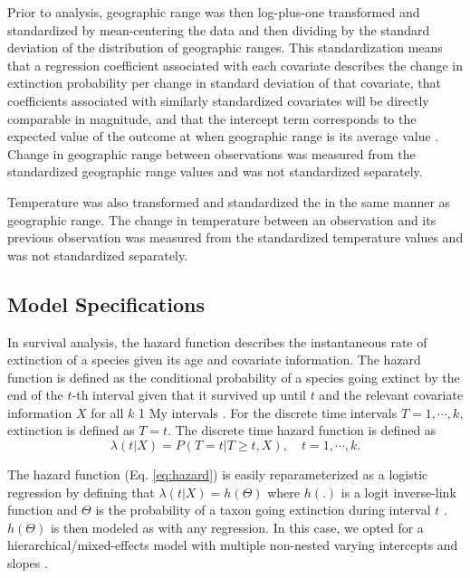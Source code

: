 \documentclass[12pt,letterpaper]{article}
\begin{document}
\begin{refsection}
Prior to analysis, geographic range was then log-plus-one transformed and standardized by mean-centering the data and then dividing by the standard deviation of the distribution of geographic ranges. This standardization means that a regression coefficient associated with each covariate describes the change in extinction probability per change in standard deviation of that covariate, that coefficients associated with similarly standardized covariates will be directly comparable in magnitude, and that the intercept term corresponds to the expected value of the outcome at when geographic range is its average value \citep{ARM}. Change in geographic range between observations was measured from the standardized geographic range values and was not standardized separately.

Temperature was also transformed and standardized the in the same manner as geographic range. The change in temperature between an observation and its previous observation was measured from the standardized temperature values and was not standardized separately.


\subsection{Model Specifications} \label{sec:model_desc}

In survival analysis, the hazard function describes the instantaneous rate of extinction of a species given its age and covariate information. The hazard function is defined as the conditional probability of a species going extinct by the end of the \(t\)-th interval given that it survived up until \(t\) and the relevant covariate information \(X\) for all \(k\) 1 My intervals \citep{Tutz2016}. For the discrete time intervals \(T = 1, \cdots, k\), extinction is defined as \(T = t\). The discrete time hazard function is defined as
\begin{equation}
 \lambda(t | X) = P(T = t | T \geq t, X), \quad t = 1, \cdots, k.
 \label{eq:hazard}
\end{equation}

The hazard function (Eq. \ref{eq:hazard}) is easily reparameterized as a logistic regression by defining that \(\lambda(t | X) = h(\Theta)\) where \(h(.)\) is a logit inverse-link function and \(\Theta\) is the probability of a taxon going extinction during interval \(t\) \citep{Tutz2016}. \(h(\Theta)\) is then modeled as with any regression. In this case, we opted for a hierarchical/mixed-effects model with multiple non-nested varying intercepts and slopes \citep{ARM}.


\end{refsection}
\end{document}
